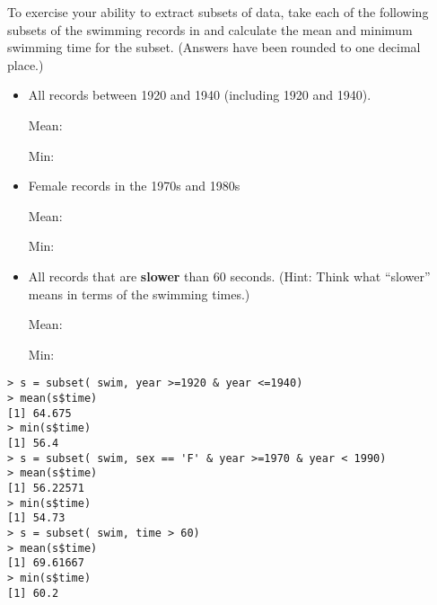 

To exercise your ability to extract subsets of data, 
take each of the following subsets of the swimming records in 
\datasetSwimming
 and calculate
the mean and minimum swimming time for the subset.  (Answers have been
rounded to one decimal place.)
\begin{itemize}
\item All records between 1920 and 1940 (including 1920 and 1940).

Mean: 

Min: 

\item Female records in the 1970s and 1980s

Mean: 

Min: 


\item All records that are {\bf slower} than 60 seconds.  (Hint: Think
  what ``slower'' means in terms of the swimming times.)

Mean: 

Min: 
\end{itemize}

\begin{AnswerText}
\begin{verbatim}
> s = subset( swim, year >=1920 & year <=1940)
> mean(s$time)
[1] 64.675
> min(s$time)
[1] 56.4
> s = subset( swim, sex == 'F' & year >=1970 & year < 1990)
> mean(s$time)
[1] 56.22571
> min(s$time)
[1] 54.73
> s = subset( swim, time > 60)
> mean(s$time)
[1] 69.61667
> min(s$time)
[1] 60.2
\end{verbatim}
\end{AnswerText}

